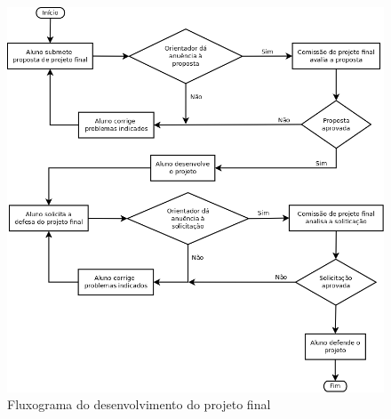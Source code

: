 \begin{figure}[htbp]
\centering
\includegraphics[width=1\textwidth]{fig/fluxograma_tcc.png}
\caption{Fluxograma do desenvolvimento do projeto final}
\label{fig:flux_tcc}
\end{figure}


